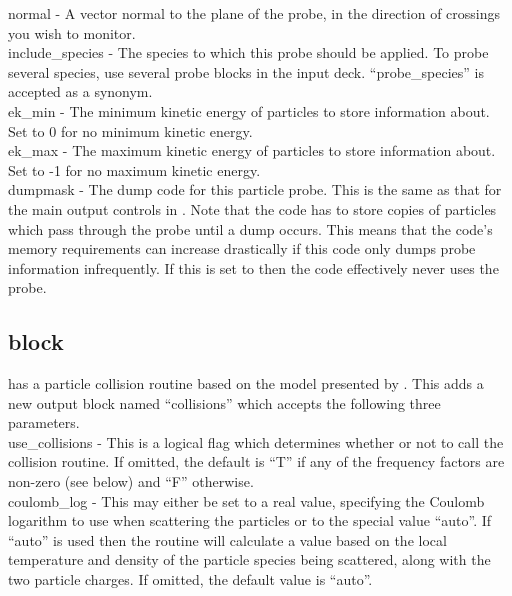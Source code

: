 {\emphtext normal} - A vector normal to the plane of the probe, in the direction
  of crossings you wish to monitor.\\

{\emphtext include\_species} - The species to which this probe should be
  applied. To probe several species, use several probe blocks in the input
  deck. ``probe\_species'' is accepted as a synonym.\\

{\emphtext ek\_min} - The minimum kinetic energy of particles to store
  information about. Set to 0 for no minimum kinetic energy.\\

{\emphtext ek\_max} - The maximum kinetic energy of particles to store
  information about. Set to -1 for no maximum kinetic energy.\\

{\emphtext dumpmask} - The dump code for this particle probe. This is the same
  as that for the main output controls in . Note that
  the code has to store copies of particles which pass through the probe until
  a dump occurs. This means that the code's memory requirements can increase
  drastically if this code only dumps probe information infrequently. If this
  is set to  then the code effectively never uses the probe.\\


\subsection{\texorpdfstring
  { block}
  {           {collisions} block}}
\label{sec:collisions_block}
{\EPOCH} has a particle collision routine based on the model presented
by \citet{Sentoku}.
This adds a new output block named ``collisions'' which accepts the
following three parameters.\\

{\emphtext use\_collisions} - This is a logical flag which determines whether
  or not to call the collision routine. If omitted, the default is ``T'' if any
  of the frequency factors are non-zero (see below) and ``F'' otherwise.\\

{\emphtext coulomb\_log} - This may either be set to a real value, specifying
  the Coulomb logarithm to use when scattering the particles or to the special
  value ``auto''. If ``auto'' is used then the routine will calculate a value
  based on the local temperature and density of the particle species being
  scattered, along with the two particle charges.  If omitted,
  the default value is ``auto''.\\


